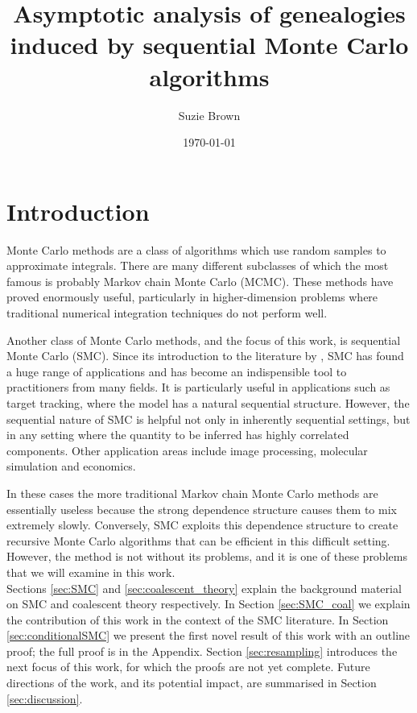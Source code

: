 \documentclass[fleqn]{article}
\title{Asymptotic analysis of genealogies induced by sequential Monte Carlo algorithms}
\author{Suzie Brown}
\date{\today}
\theoremstyle{definition}
\begin{document}
\maketitle
\thispagestyle{fancy}

\section{Introduction}
Monte Carlo methods are a class of algorithms which use random samples to approximate integrals. 
There are many different subclasses of which the most famous is probably Markov chain Monte Carlo (MCMC). 
These methods have proved enormously useful, particularly in higher-dimension problems where traditional numerical integration techniques do not perform well.

Another class of Monte Carlo methods, and the focus of this work, is sequential Monte Carlo (SMC). Since its introduction to the literature by \citet{gordon1993}, SMC has found a huge range of applications and has become an indispensible tool to practitioners from many fields. 
It is particularly useful in applications such as target tracking, where the model has a natural sequential structure.
However, the sequential nature of SMC is helpful not only in inherently sequential settings, but in any setting where the quantity to be inferred has highly correlated components.
Other application areas include image processing, molecular simulation and economics.

In these cases the more traditional Markov chain Monte Carlo methods are essentially useless because the strong dependence structure causes them to mix extremely slowly.
Conversely, SMC exploits this dependence structure to create recursive Monte Carlo algorithms that can be efficient in this difficult setting.
However, the method is not without its problems, and it is one of these problems that we will examine in this work.\\

Sections \ref{sec:SMC} and \ref{sec:coalescent_theory} explain the background material on SMC and coalescent theory respectively. In Section \ref{sec:SMC_coal} we explain the contribution of this work in the context of the SMC literature.
In Section \ref{sec:conditionalSMC} we present the first novel result of this work with an outline proof; the full proof is in the Appendix.
Section \ref{sec:resampling} introduces the next focus of this work, for which the proofs are not yet complete.
Future directions of the work, and its potential impact, are summarised in Section \ref{sec:discussion}.\\
\end{document}
